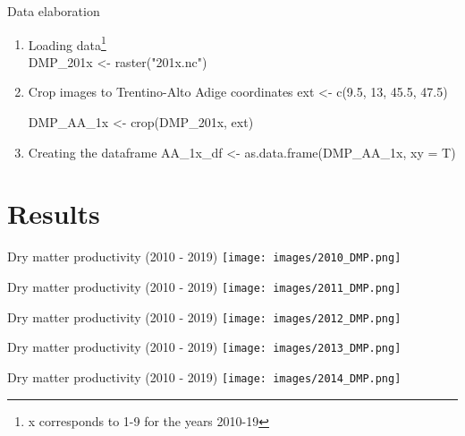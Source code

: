\documentclass[pdf]{beamer}
\newenvironment{code}%
   {\snugshade\verbatim}%
   {\endverbatim\endsnugshade}
\begin{document}
\begin{frame}[fragile]{Data elaboration}
\begin{enumerate}
    \item Loading data\footnote{\tiny x corresponds to 1-9 for the years 2010-19} \\
        \begin{code}
DMP_201x <- raster("201x.nc")\end{code}

    \item Crop images to Trentino-Alto Adige coordinates
        \begin{code}
ext <- c(9.5, 13, 45.5, 47.5)

DMP_AA_1x <- crop(DMP_201x, ext)\end{code}

    \item Creating the dataframe
\begin{code}   
AA_1x_df <- as.data.frame(DMP_AA_1x, xy = T)
\end{code}
\end{enumerate}
\end{frame}

\section{Results}
    \begin{frame}{Dry matter productivity (2010 - 2019)}
	\texttt{[image: images/2010\_DMP.png]}
    \end{frame}

    \begin{frame}{Dry matter productivity (2010 - 2019)}
	\texttt{[image: images/2011\_DMP.png]}
    \end{frame}

    \begin{frame}{Dry matter productivity (2010 - 2019)}
	\texttt{[image: images/2012\_DMP.png]}
    \end{frame}

    \begin{frame}{Dry matter productivity (2010 - 2019)}
	\texttt{[image: images/2013\_DMP.png]}
    \end{frame}

    \begin{frame}{Dry matter productivity (2010 - 2019)}
	\texttt{[image: images/2014\_DMP.png]}
    \end{frame}
\end{document}
